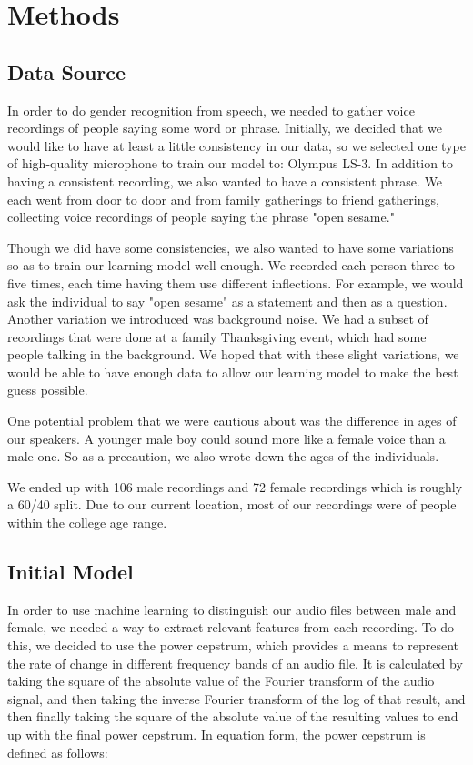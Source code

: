 \documentclass{article}
\begin{document}
\section{Methods}

\subsection{Data Source}

In order to do gender recognition from speech, we needed to gather voice recordings of people saying some word or phrase. Initially, we decided that we would like to have at least a little consistency in our data, so we selected one type of high-quality microphone to train our model to: Olympus LS-3. In addition to having a consistent recording, we also wanted to have a consistent phrase.  We each went from door to door and from family gatherings to friend gatherings, collecting voice recordings of people saying the phrase "open sesame."

Though we did have some consistencies, we also wanted to have some variations so as to train our learning model well enough. We recorded each person three to five times, each time having them use different inflections. For example, we would ask the individual to say "open sesame" as a statement and then as a question. Another variation we introduced was background noise. We had a subset of recordings that were done at a family Thanksgiving event, which had some people talking in the background. We hoped that with these slight variations, we would be able to have enough data to allow our learning model to make the best guess possible.

One potential problem that we were cautious about was the difference in ages of our speakers. A younger male boy could sound more like a female voice than a male one. So as a precaution, we also wrote down the ages of the individuals.

We ended up with 106 male recordings and 72 female recordings which is roughly a 60/40 split. Due to our current location, most of our recordings were of people within the college age range. 

\subsection{Initial Model}

In order to use machine learning to distinguish our audio files between male and female, we needed a way to extract relevant features from each recording.  To do this, we decided to use the power cepstrum, which provides a means to represent the rate of change in different frequency bands of an audio file.  It is calculated by taking the square of the absolute value of the Fourier transform of the audio signal, and then taking the inverse Fourier transform of the log of that result, and then finally taking the square of the absolute value of the resulting values to end up with the final power cepstrum.  In equation form, the power cepstrum is defined as follows:
\end{document}
